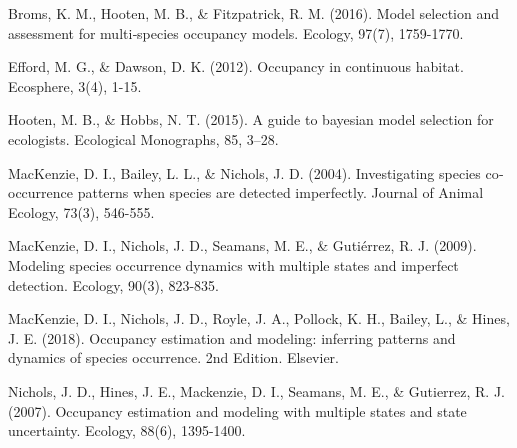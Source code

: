 \documentclass[12pt]{article}
\begin{document}
\begin{thebibliography}{100}
Broms, K. M., Hooten, M. B., \& Fitzpatrick, R. M. (2016). Model selection and assessment for multi‐species occupancy models. Ecology, 97(7), 1759-1770.

Efford, M. G., \& Dawson, D. K. (2012). Occupancy in continuous habitat. Ecosphere, 3(4), 1-15.


Hooten, M. B., \& Hobbs, N. T. (2015). A guide to bayesian model selection for ecologists. Ecological Monographs, 85, 3–28.

MacKenzie, D. I., Bailey, L. L., \& Nichols, J. D. (2004). Investigating species co‐occurrence patterns when species are detected imperfectly. Journal of Animal Ecology, 73(3), 546-555.

MacKenzie, D. I., Nichols, J. D., Seamans, M. E., \& Gutiérrez, R. J. (2009). Modeling species occurrence dynamics with multiple states and imperfect detection. Ecology, 90(3), 823-835.

MacKenzie, D. I., Nichols, J. D., Royle, J. A., Pollock, K. H., Bailey, L., \& Hines, J. E. (2018). Occupancy estimation and modeling: inferring patterns and dynamics of species occurrence. 2nd Edition. Elsevier.

Nichols, J. D., Hines, J. E., Mackenzie, D. I., Seamans, M. E., \& Gutierrez, R. J. (2007). Occupancy estimation and modeling with multiple states and state uncertainty. Ecology, 88(6), 1395-1400.
\end{thebibliography}
\end{document}
